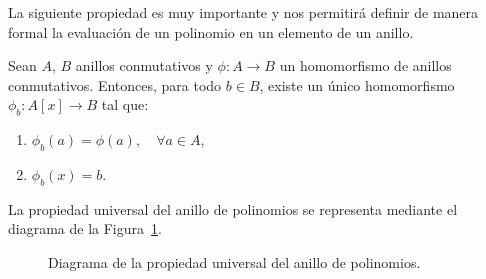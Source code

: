 La siguiente propiedad es muy importante y nos permitirá definir de manera formal la evaluación de un polinomio en un elemento de un anillo.
\begin{teo}
    Sean $A$, $B$ anillos conmutativos y $\phi:A\longrightarrow B$ un homomorfismo de anillos conmutativos. Entonces, para todo $b\in B$, existe un único homomorfismo $\phi_b:A[x]\longrightarrow B$ tal que:
    \begin{enumerate}
        \item $\phi_b(a) = \phi(a), \quad \forall a\in A$,
        \item $\phi_b(x) = b$.
    \end{enumerate}
    La propiedad universal del anillo de polinomios se representa mediante el diagrama de la Figura~\ref{fig:propiedad_universal}.
    \begin{figure}[h]
        \centering
        \caption{Diagrama de la propiedad universal del anillo de polinomios.}
        \label{fig:propiedad_universal}
    \end{figure}
\end{teo}
